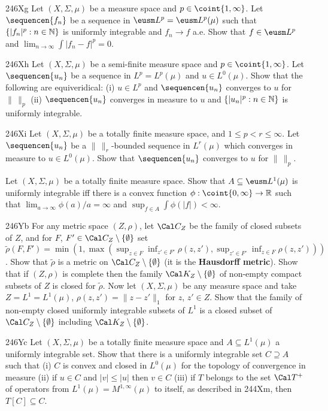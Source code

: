 {\sqheader 246Xg Let $(X,\Sigma,\mu)$ be a measure space and
$p\in\coint{1,\infty}$.   Let $\sequencen{f_n}$ be a sequence in
$\eusm L^p=\eusm L^p(\mu)$ such that $\{|f_n|^p:n\in\Bbb N\}$ is
uniformly
integrable and $f_n\to f$ a.e.   Show that $f\in\eusm L^p$ and
$\lim_{n\to\infty}\int|f_n-f|^p=0$.

\spheader 246Xh Let $(X,\Sigma,\mu)$ be a semi-finite measure space and
$p\in\coint{1,\infty}$.   Let $\sequencen{u_n}$ be a sequence in
$L^p=L^p(\mu)$ and $u\in L^0(\mu)$.   Show that the following are
equiveridical:  (i) $u\in L^p$ and $\sequencen{u_n}$ converges to $u$ for
$\|\,\|_p$ (ii) $\sequencen{u_n}$ converges in measure to $u$ and
$\{|u_n|^p:n\in\Bbb N\}$ is uniformly integrable.   

\spheader 246Xi Let $(X,\Sigma,\mu)$ be a totally finite measure space,
and $1\le p<r\le\infty$.   Let $\sequencen{u_n}$ be a
$\|\,\|_r$-bounded sequence in $L^r(\mu)$ which converges in measure to
$u\in L^0(\mu)$.   Show that $\sequencen{u_n}$ converges to $u$ for
$\|\,\|_p$.   

\ifdim\pagewidth>467pt\fontdimen4\tenrm=1.5pt\fi
Let $(X,\Sigma,\mu)$ be a totally finite measure space.   Show that
$A\subseteq\eusm L^1(\mu)$ is uniformly integrable iff there is a convex
function $\phi:\coint{0,\infty}\to\Bbb R$ such that
$\lim_{a\to\infty}\phi(a)/a=\infty$ and
$\sup_{f\in A}\int\phi(|f|)<\infty$.
\tenrm=1.11pt

\spheader 246Yb For any metric space $(Z,\rho)$, let $\Cal C_Z$ be the
family of closed subsets of $Z$, and for $F$,
$F'\in\Cal C_Z\setminus\{\emptyset\}$ set
$\tilde\rho(F,F')=\min(1,\max(\sup_{z\in F}\inf_{z'\in F'}\rho(z,z'),
\sup_{z'\in F'}\inf_{z\in F}\rho(z,z')))$.
Show that $\tilde\rho$ is a metric on $\Cal C_Z\setminus\{\emptyset\}$
(it is the {\bf
Hausdorff metric}).    Show that if $(Z,\rho)$ is complete then the family $\Cal K_Z\setminus\{\emptyset\}$ of non-empty compact
subsets of $Z$ is closed for $\tilde\rho$.   Now let $(X,\Sigma,\mu)$ be
any measure space and take $Z=L^1=L^1(\mu)$, $\rho(z,z')=\|z-z'\|_1$ for
$z$, $z'\in Z$.   Show that the family of non-empty closed uniformly
integrable subsets of $L^1$ is a closed subset of
$\Cal C_Z\setminus\{\emptyset\}$ including
$\Cal K_Z\setminus\{\emptyset\}$.

\spheader 246Yc Let $(X,\Sigma,\mu)$ be a totally finite measure space
and $A\subseteq L^1(\mu)$ a uniformly integrable set.   Show that there
is a uniformly integrable set $C\supseteq A$ such that (i) $C$ is convex
and closed in $L^0(\mu)$ for the topology of convergence in measure (ii)
if $u\in C$ and $|v|\le|u|$ then $v\in C$ (iii) if $T$ belongs to the
set $\Cal T^+$ of operators from $L^1(\mu)=M^{1,\infty}(\mu)$ to itself,
as described in 244Xm, then $T[C]\subseteq C$.

}
